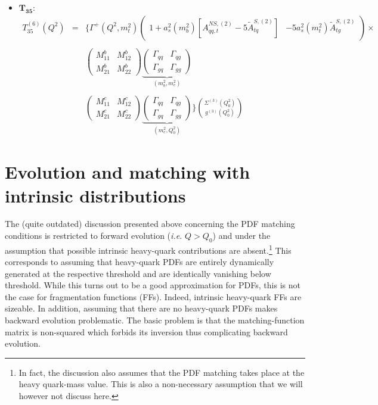 \documentclass[10pt,a4paper]{article}
\begin{document}
\begin{itemize}
\begin{equation}
\end{equation}
\item $\mathbf{T_{35}}$:
\begin{equation}
\begin{array}{rcl}
T^{(6)}_{35}(Q^2)&=&\displaystyle \Big\{\Gamma^{+}(Q^2,m_t^2)\begin{pmatrix} 1+a_s^2(m_b^2)[A_{qq,t}^{N\!S,(2)}-5\tilde{A}^{S,(2)}_{tq}] & -5a_s^2(m_t^2)\tilde{A}^{S,(2)}_{tg}\end{pmatrix}\times\\
\\
& &\displaystyle\begin{pmatrix} M_{11}^b & M_{12}^b \\ M_{21}^b & M_{22}^b\end{pmatrix}\underbrace{\begin{pmatrix} \Gamma_{qq}& \Gamma_{qg} \\ \Gamma_{gq}& \Gamma_{gg}\end{pmatrix}}_{(m_b^2,m_c^2)}\\
\\
& &\displaystyle\begin{pmatrix} M_{11}^c & M_{12}^c \\ M_{21}^c & M_{22}^c\end{pmatrix}\underbrace{\begin{pmatrix} \Gamma_{qq}& \Gamma_{qg} \\ \Gamma_{gq}& \Gamma_{gg}\end{pmatrix}}_{(m_c^2,Q_0^2)}\Bigg\}{\Sigma^{(3)}(Q_0^2) \choose g^{(3)}(Q_0^2)}
\end{array}
\end{equation}
\end{itemize}

\section{Evolution and matching with intrinsic distributions}

The (quite outdated) discussion presented above concerning the PDF
matching conditions is restricted to forward evolution (\textit{i.e.}
$Q>Q_0$) and under the assumption that possible intrinsic heavy-quark
contributions are absent.\footnote{In fact, the discussion also
  assumes that the PDF matching takes place at the heavy quark-mass
  value. This is also a non-necessary assumption that we will however
  not discuss here.} This corresponds to assuming that heavy-quark
PDFs are entirely dynamically generated at the respective threshold
and are identically vanishing below threshold. While this turns out to
be a good approximation for PDFs, this is not the case for
fragmentation functions (FFs). Indeed, intrinsic heavy-quark FFs are
sizeable. In addition, assuming that there are no heavy-quark PDFs
makes backward evolution problematic. The basic problem is that the
matching-function matrix is non-squared which forbids its inversion
thus complicating backward evolution.
\end{document}
